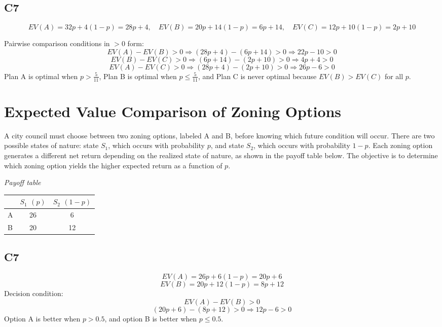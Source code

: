 \begin{ExamProblems}
		\subsection*{C7}
		\[
		EV(A)=32p+4(1-p)=28p+4,\quad
		EV(B)=20p+14(1-p)=6p+14,\quad
		EV(C)=12p+10(1-p)=2p+10
		\]
		
		Pairwise comparison conditions in $>0$ form:
		\[
		EV(A)-EV(B)>0 \Rightarrow (28p+4)-(6p+14)>0 \Rightarrow 22p-10>0
		\]
		\[
		EV(B)-EV(C)>0 \Rightarrow (6p+14)-(2p+10)>0 \Rightarrow 4p+4>0
		\]
		\[
		EV(A)-EV(C)>0 \Rightarrow (28p+4)-(2p+10)>0 \Rightarrow 26p-6>0
		\]
		Plan A is optimal when $p>\frac{5}{11}$, Plan B is optimal when $p \le \frac{5}{11}$, and Plan C is never optimal because $EV(B) > EV(C)$ for all $p$.
		
		\item
		\section{Expected Value Comparison of Zoning Options}
		A city council must choose between two zoning options, labeled A and B, before knowing which future condition will occur.
		There are two possible states of nature: state $S_1$, which occurs with probability $p$, and state $S_2$, which occurs with probability $1-p$.
		Each zoning option generates a different net return depending on the realized state of nature, as shown in the payoff table below.
		The objective is to determine which zoning option yields the higher expected return as a function of $p$.
		
		\begin{center}
			\textit{Payoff table} \\
			\begin{tabular}{l c c}
				\toprule
				& $S_1$ $(p)$ & $S_2$ $(1-p)$ \\
				\midrule
				A & 26 & 6 \\
				B & 20 & 12 \\
				\bottomrule
			\end{tabular}
		\end{center}
		
		\subsection*{C7}
		\[
		EV(A)=26p+6(1-p)=20p+6
		\]
		\[
		EV(B)=20p+12(1-p)=8p+12
		\]
		Decision condition:
		\[
		EV(A)-EV(B)>0
		\]
		\[
		(20p+6)-(8p+12)>0 \Rightarrow 12p-6>0
		\]
		Option A is better when $p>0.5$, and option B is better when $p \le 0.5$.
	\end{ExamProblems}


